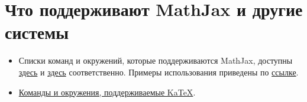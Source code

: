 \section{Что поддерживают MathJax и другие системы}
\begin{itemize}
\item Списки команд и окружений, которые поддерживаются MathJax, доступны \href{https://docs.mathjax.org/en/latest/tex.html#symbols}{здесь} и \href{http://docs.mathjax.org/en/latest/tex.html#environments}{здесь} соответственно. Примеры использования приведены по \href{http://meta.math.stackexchange.com/questions/5020/mathjax-basic-tutorial-and-quick-reference}{ссылке}.
\item \href{https://katex.org/docs/supported}{Команды и окружения, поддерживаемые KaTeX}.
\end{itemize}
